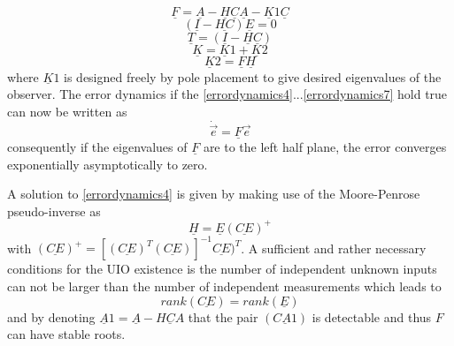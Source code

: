 %
\begin{equation}
\underline F = \underline A-\underline H \underline C \underline A-\underline K1 \underline C
\label{errordynamics3}
\end{equation}
\begin{equation}
(\underline I - \underline{HC})\underline E = 0
\label{errordynamics4}
\end{equation}
\begin{equation}
\underline T = (\underline I - \underline H\underline C)
\label{errordynamics5}
\end{equation}
\begin{equation}
\underline K = \underline K1 +\underline K2
\label{errordynamics6}
\end{equation}
\begin{equation}
\underline K2 =\underline F \underline H 
\label{errordynamics7}
\end{equation}
where $\underline K1$ is designed freely by pole placement to give desired eigenvalues of the observer. The error dynamics if the \ref{errordynamics4}...\ref{errordynamics7} hold true can now be written as 
\begin{equation}
\dot{\vec{e}} = \underline F \vec{e}
\label{errordynamics8}
\end{equation}
consequently if the eigenvalues of $\underline F$ are to the left half plane, the error converges exponentially asymptotically to zero. 

A solution to \eqref{errordynamics4} is given by making use of the Moore-Penrose pseudo-inverse as
\begin{equation}
\underline H = \underline E (\underline{CE})^{+}
\label{errordynamics9}
\end{equation}
with $(\underline{CE})^{+} = [(\underline{CE})^{T} (\underline{CE})]^{-1}\underline{CE})^{T} $.
A sufficient and rather necessary conditions for the UIO existence is the number of independent unknown inputs can not be larger than the number of independent measurements which leads to
\begin{equation}
rank (\underline{CE}) =rank( \underline E) 
\label{errordynamics10}
\end{equation}
and by denoting $\underline A1 = \underline A - \underline{HCA} $ that the pair $(\underline {CA1})$ is detectable and thus $F$ can have stable roots.
